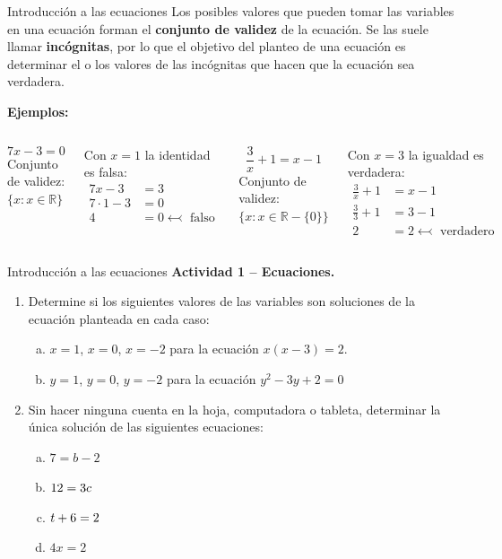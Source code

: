 \documentclass[9pt, aspectratio=169]{beamer}
\begin{document}
\begin{frame}{Introducción a las ecuaciones}
    Los posibles valores que pueden tomar las variables en una ecuación forman el \textbf{conjunto de validez} de la ecuación. Se las suele llamar \textbf{incógnitas}, por lo que el objetivo del planteo de una ecuación es determinar el o los valores de las incógnitas que hacen que la ecuación sea verdadera.

\textbf{Ejemplos:}
\begin{columns}
\cx
    \[ 7x-3 = 0 \]
   Conjunto de validez: $\{x : x \in \mathbb{R} \}$

   Con $x = 1$ la identidad es falsa:
   \begin{align*}
       7 x - 3 &= 3 \\
       7 \cdot 1 - 3 &= 0 \\
       4 &= 0 \leftarrowtail \text{ falso}
   \end{align*}
   \pause

   \cx
   \[ \frac{3}{x} + 1 = x - 1 \]
   Conjunto de validez: $\{ x : x \in \mathbb{R} - \{ 0 \} \}$ 

   Con $x = 3$ la igualdad es verdadera:
   \begin{align*}
       \frac{3}{x} + 1 &= x - 1 \\
       \frac{3}{3} + 1 &= 3 - 1 \\
       2 &= 2 \leftarrowtail \text{ verdadero}
   \end{align*}
\end{columns}
\end{frame}

\begin{frame}{Introducción a las ecuaciones}
    \textbf{Actividad 1 -- Ecuaciones.}
    \begin{enumerate}
        \item Determine si los siguientes valores de las variables son soluciones de la ecuación planteada en cada caso:
            \begin{enumerate}[a)]
                \item $x = 1$, $x = 0$, $x = -2$ para la ecuación $x(x-3) = 2$. \medskip
                \item $y = 1$, $y = 0$, $y = -2$ para la ecuación $y^2 - 3y + 2 = 0$ \medskip
            \end{enumerate}
        \item Sin hacer ninguna cuenta en la hoja, computadora o tableta, determinar la única solución de las siguientes ecuaciones:
            \begin{enumerate}[a)]
                \item $7 = b - 2$ \medskip
                \item $12 = 3 c \medskip$
                \item $t + 6 = 2 \medskip$
                \item $4x = 2$
            \end{enumerate}
    \end{enumerate}
\end{frame}
\end{document}
